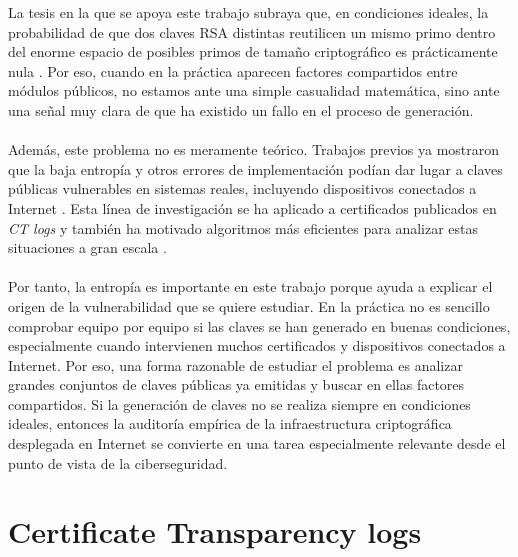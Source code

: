 La tesis en la que se apoya este trabajo subraya que, en condiciones ideales, la probabilidad de que dos claves RSA distintas reutilicen un mismo primo dentro del enorme espacio de posibles primos de tamaño criptográfico es prácticamente nula \citep{vage2022finding}. Por eso, cuando en la práctica aparecen factores compartidos entre módulos públicos, no estamos ante una simple casualidad matemática, sino ante una señal muy clara de que ha existido un fallo en el proceso de generación.
\\
\\
Además, este problema no es meramente teórico. Trabajos previos ya mostraron que la baja entropía y otros errores de implementación podían dar lugar a claves públicas vulnerables en sistemas reales, incluyendo dispositivos conectados a Internet \citep{heninger2012mining}. Esta línea de investigación se ha aplicado a certificados publicados en \textit{CT logs} y también ha motivado algoritmos más eficientes para analizar estas situaciones a gran escala \citep{vage2022finding,pelofske2024efficient}.
\\
\\
Por tanto, la entropía es importante en este trabajo porque ayuda a explicar el origen de la vulnerabilidad que se quiere estudiar. En la práctica no es sencillo comprobar equipo por equipo si las claves se han generado en buenas condiciones, especialmente cuando intervienen muchos certificados y dispositivos conectados a Internet. Por eso, una forma razonable de estudiar el problema es analizar grandes conjuntos de claves públicas ya emitidas y buscar en ellas factores compartidos. Si la generación de claves no se realiza siempre en condiciones ideales, entonces la auditoría empírica de la infraestructura criptográfica desplegada en Internet se convierte en una tarea especialmente relevante desde el punto de vista de la ciberseguridad.

\section{Certificate Transparency logs}

